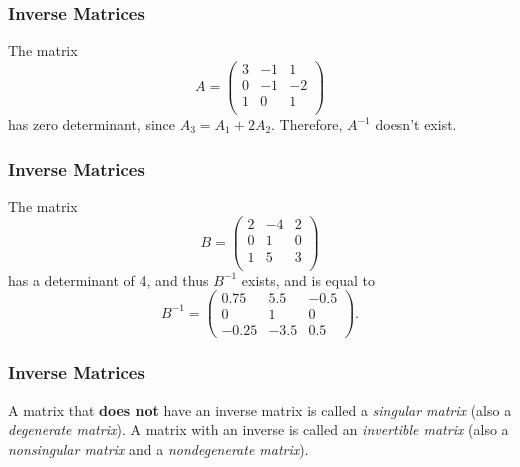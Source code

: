 \begin{frame}
  \frametitle{Inverse Matrices}
  \begin{presentation_example}
    The matrix
    \begin{equation*}
      A =
      \begin{pmatrix}
        3 & -1 & 1\\
        0 & -1 & -2\\
        1 & 0  & 1\\
      \end{pmatrix}
    \end{equation*}
    has zero determinant, since $A_{3} = A_{1} + 2A_{2}$. Therefore, $A^{-1}$ doesn't exist.
  \end{presentation_example}
\end{frame}

\begin{frame}
  \frametitle{Inverse Matrices}
  \begin{presentation_example}
    The matrix
    \begin{equation*}
      B =
      \begin{pmatrix}
        2 & -4 & 2\\
        0 & 1 & 0\\
        1 & 5 & 3\\
      \end{pmatrix}
    \end{equation*}
    has a determinant of 4, and thus $B^{-1}$ exists, and is equal to 
    \begin{equation*}
      B^{-1} =
      \begin{pmatrix}
        0.75 & 5.5 & -0.5 \\
        0 & 1 & 0 \\
        -0.25 & -3.5 & 0.5
      \end{pmatrix}.
    \end{equation*}
  \end{presentation_example}
\end{frame}

\begin{frame}
  \frametitle{Inverse Matrices}
  A matrix that \textbf{does not} have an inverse matrix is called a \emph{singular matrix} (also a \emph{degenerate matrix}). A matrix with an inverse is called an \emph{invertible matrix} (also a \emph{nonsingular matrix} and a \emph{nondegenerate matrix}).\\

\end{frame}

